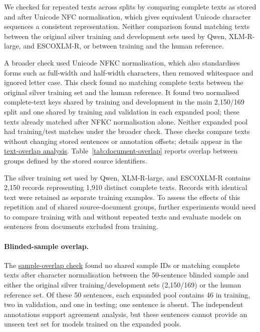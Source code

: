 We checked for repeated texts across splits by comparing complete texts as stored and after Unicode NFC normalisation, which gives equivalent Unicode character sequences a consistent representation. Neither comparison found matching texts between the original silver training and development sets used by Qwen, XLM-R-large, and ESCOXLM-R, or between training and the human reference.

A broader check used Unicode NFKC normalisation, which also standardises forms such as full-width and half-width characters, then removed whitespace and ignored letter case. This check found no matching complete texts between the original silver training set and the human reference. It found two normalised complete-text keys shared by training and development in the main 2,150/169 split and one shared by training and validation in each expanded pool; these texts already matched after NFKC normalisation alone. Neither expanded pool had training/test matches under the broader check. These checks compare texts without changing stored sentences or annotation offsets; details appear in the \href{https://github.com/AlfredJamesLi/chinese-skillspan-benchmark/blob/24847748b314b205e9b896c1f30ecc5d7c7bdf1e/reproduction/major_revision_20261004/data_audit/audit.json}{text-overlap analysis}. Table~\ref{tab:document-overlap} reports overlap between groups defined by the stored source identifiers.

The silver training set used by Qwen, XLM-R-large, and ESCOXLM-R contains 2,150 records representing 1,910 distinct complete texts. Records with identical text were retained as separate training examples. To assess the effects of this repetition and of shared source-document groups, further experiments would need to compare training with and without repeated texts and evaluate models on sentences from documents excluded from training.

\paragraph{Blinded-sample overlap.}
The \href{https://github.com/AlfredJamesLi/chinese-skillspan-benchmark/tree/main/reproduction/reviewer_supplement_20261004}{sample-overlap check} found no shared sample IDs or matching complete texts after character normalisation between the 50-sentence blinded sample and either the original silver training/development sets (2,150/169) or the human reference set. Of these 50 sentences, each expanded pool contains 46 in training, two in validation, and one in testing; one sentence is absent. The independent annotations support agreement analysis, but these sentences cannot provide an unseen test set for models trained on the expanded pools.

